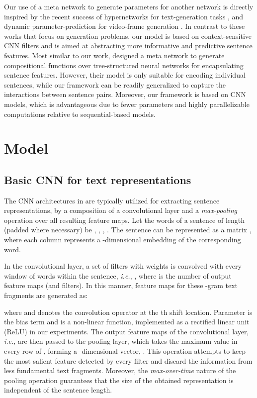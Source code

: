 \documentclass[11pt,a4paper]{article}
\begin{document}
Our use of a meta network to generate parameters for another network is directly inspired by the recent success of hypernetworks for text-generation tasks \citep{ha2016hypernetworks}, and dynamic parameter-prediction for video-frame generation \citep{de2016dynamic}. In contrast to these works that focus on generation problems, our model is based on context-sensitive CNN filters and is aimed at abstracting more informative and predictive sentence features. Most similar to our work, \citet{liu2017dynamic} designed a meta network to generate compositional functions over tree-structured neural networks for encapsulating sentence features. However, their model is only suitable for encoding individual sentences, while our framework can be readily generalized to capture the interactions between sentence pairs. Moreover, our framework is based on CNN models, which is advantageous due to fewer parameters and highly parallelizable computations relative to sequential-based models. 

\section{Model}
\subsection{Basic CNN for text representations} \label{sec:basic}

The CNN architectures in \citep{kim2014convolutional, collobert2011natural} are typically utilized for extracting sentence representations, by a composition of a convolutional layer and a \emph{max-pooling} operation over all resulting feature maps. Let the words of a sentence of length  (padded where necessary) be , ,  , . The sentence can be represented as a matrix , where each column represents a -dimensional embedding of the corresponding word.

In the convolutional layer, a set of filters with weights  is convolved with every window of  words within the sentence, \emph{i.e.}, , where  is the number of output feature maps (and filters). In this manner, feature maps  for these -gram text fragments are generated as:

where  and  denotes the convolution operator at the th shift location. 
Parameter  is the bias term and  is a non-linear function, implemented as a rectified linear unit (ReLU) in our experiments. 
The output feature maps of the convolutional layer, \emph{i.e.},  are then passed to the pooling layer, which takes the maximum value in every row of , forming a -dimensional vector, . This operation attempts to keep the most salient feature detected by every filter and discard the information from less fundamental text fragments. Moreover, the \emph{max-over-time} nature of the pooling operation \citep{collobert2011natural} guarantees that the size of the obtained representation is independent of the sentence length.
\end{document}
